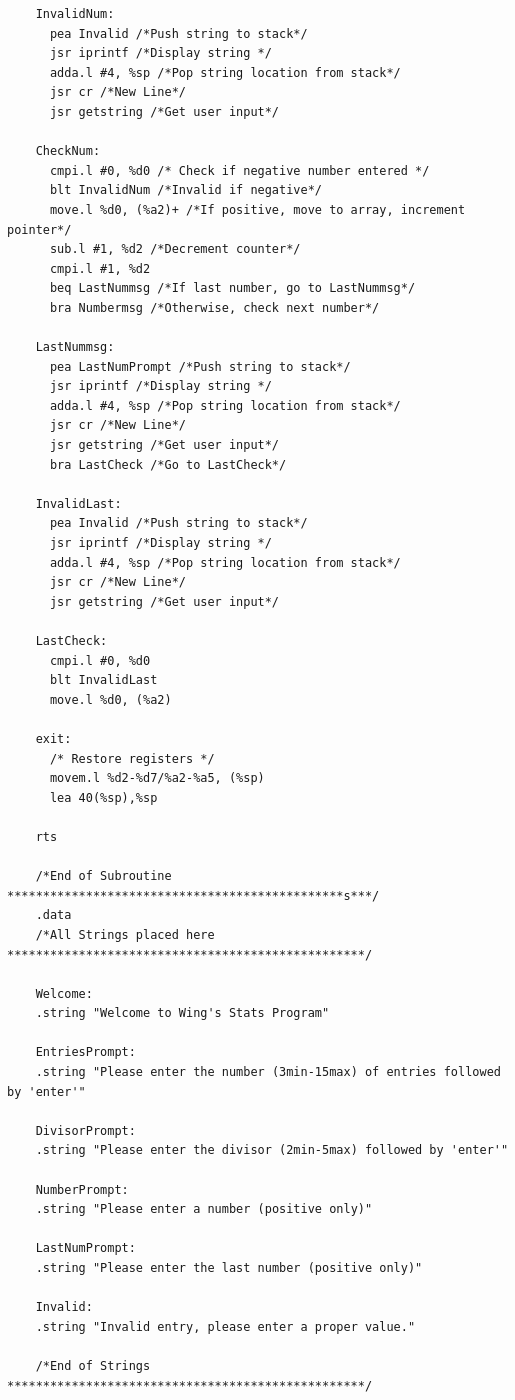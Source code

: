\documentclass[10pt, letterpaper, titlepage]{article} %
\begin{document}
\begin{lstlisting}
	InvalidNum:
	  pea Invalid /*Push string to stack*/
	  jsr iprintf /*Display string */
	  adda.l #4, %sp /*Pop string location from stack*/
	  jsr cr /*New Line*/
	  jsr getstring /*Get user input*/
	
	CheckNum:
	  cmpi.l #0, %d0 /* Check if negative number entered */
	  blt InvalidNum /*Invalid if negative*/
	  move.l %d0, (%a2)+ /*If positive, move to array, increment pointer*/
	  sub.l #1, %d2 /*Decrement counter*/
	  cmpi.l #1, %d2
	  beq LastNummsg /*If last number, go to LastNummsg*/
	  bra Numbermsg /*Otherwise, check next number*/
	
	LastNummsg:
	  pea LastNumPrompt /*Push string to stack*/
	  jsr iprintf /*Display string */
	  adda.l #4, %sp /*Pop string location from stack*/
	  jsr cr /*New Line*/
	  jsr getstring /*Get user input*/
	  bra LastCheck /*Go to LastCheck*/
	
	InvalidLast:
	  pea Invalid /*Push string to stack*/
	  jsr iprintf /*Display string */
	  adda.l #4, %sp /*Pop string location from stack*/
	  jsr cr /*New Line*/
	  jsr getstring /*Get user input*/
	
	LastCheck:
	  cmpi.l #0, %d0
	  blt InvalidLast
	  move.l %d0, (%a2)
	
	exit:
	  /* Restore registers */
	  movem.l %d2-%d7/%a2-%a5, (%sp)
	  lea 40(%sp),%sp
	
	rts
	
	/*End of Subroutine ***********************************************s***/
	.data
	/*All Strings placed here **************************************************/
	
	Welcome:
	.string "Welcome to Wing's Stats Program"
	
	EntriesPrompt:
	.string "Please enter the number (3min-15max) of entries followed by 'enter'"
	
	DivisorPrompt:
	.string "Please enter the divisor (2min-5max) followed by 'enter'"
	
	NumberPrompt:
	.string "Please enter a number (positive only)"
	
	LastNumPrompt:
	.string "Please enter the last number (positive only)"
	
	Invalid:
	.string "Invalid entry, please enter a proper value."
	
	/*End of Strings **************************************************/
\end{lstlisting}

\newpage
\end{document}
